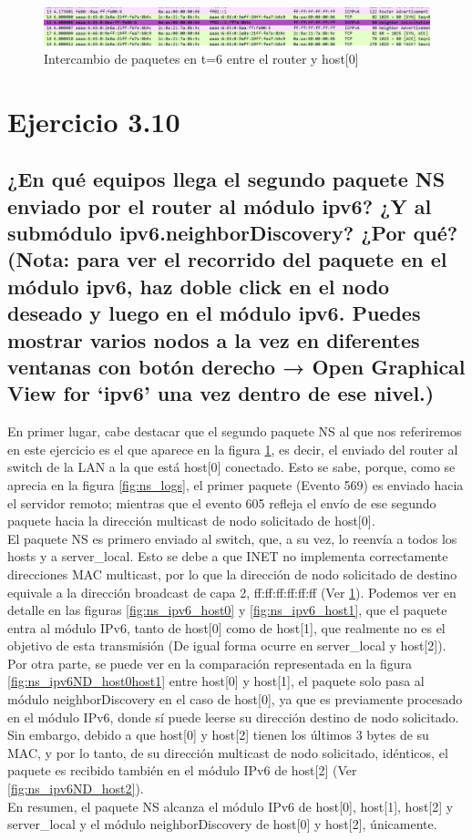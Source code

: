 \begin{figure}[H]
    \centering
    \includegraphics[width=135mm, scale=0.75]{imaxes/ejercicio3_9_1.png}
    \caption{Intercambio de paquetes en t=6 entre el router y host[0]}
    \label{fig:ns_from_router_to_host0}
\end{figure}

\section{Ejercicio 3.10}
\subsection{¿En qué equipos llega el segundo paquete NS enviado por el router al módulo ipv6? ¿Y al submódulo
ipv6.neighborDiscovery? ¿Por qué? (Nota: para ver el recorrido del paquete en el módulo ipv6, haz doble click en
el nodo deseado y luego en el módulo ipv6. Puedes mostrar varios nodos a la vez en diferentes ventanas con
botón derecho → Open Graphical View for ‘ipv6’ una vez dentro de ese nivel.)}

En primer lugar, cabe destacar que el segundo paquete NS al que nos referiremos en este ejercicio es el que aparece en la figura \ref{fig:ns_from_router_to_host0}, es decir, el enviado del router al switch de la LAN a la que está host[0] conectado. Esto se sabe, porque, como se aprecia en la figura \ref{fig:ns_logs}, el primer paquete (Evento 569) es enviado hacia el servidor remoto; mientras que el evento 605 refleja el envío de ese segundo paquete hacia la dirección multicast de nodo solicitado de host[0].\\
El paquete NS es primero enviado al switch, que, a su vez, lo reenvía a todos los hosts y a server\_local. Esto se debe a que INET no implementa correctamente direcciones MAC multicast, por lo que la dirección de nodo solicitado de destino equivale a la dirección broadcast de capa 2, ff:ff:ff:ff:ff:ff (Ver \ref{fig:ns_from_router_to_host0}). Podemos ver en detalle en las figuras \ref{fig:ns_ipv6_host0} y \ref{fig:ns_ipv6_host1}, que el paquete entra al módulo IPv6, tanto de host[0] como de host[1], que realmente no es el objetivo de esta transmisión (De igual forma ocurre en server\_local y host[2]).\\
Por otra parte, se puede ver en la comparación representada en la figura \ref{fig:ns_ipv6ND_host0host1} entre host[0] y host[1], el paquete solo pasa al módulo neighborDiscovery en el caso de host[0], ya que es previamente procesado en el módulo IPv6, donde sí puede leerse su dirección destino de nodo solicitado. Sin embargo, debido a que host[0] y host[2] tienen los últimos 3 bytes de su MAC, y por lo tanto, de su dirección multicast de nodo solicitado, idénticos, el paquete es recibido también en el módulo IPv6 de host[2] (Ver \ref{fig:ns_ipv6ND_host2}).\\
En resumen, el paquete NS alcanza el módulo IPv6 de host[0], host[1], host[2] y server\_local y el módulo neighborDiscovery de host[0] y host[2], únicamente. 

